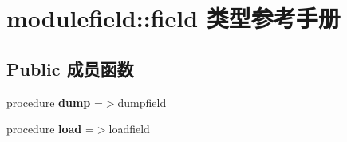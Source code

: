 \hypertarget{structmodulefield_1_1field}{}\section{modulefield\+::field 类型参考手册}
\label{structmodulefield_1_1field}
\subsection*{Public 成员函数}
\begin{DoxyCompactItemize}
\item 
\mbox{\label{structmodulefield_1_1field_a24838bd448e5a27b2546525b1079ba67}} 
procedure {\bfseries dump} =$>$dumpfield
\item 
\mbox{\label{structmodulefield_1_1field_a80eb3910306e1e8373cfb3927d956c87}} 
procedure {\bfseries load} =$>$loadfield
\end{DoxyCompactItemize}
